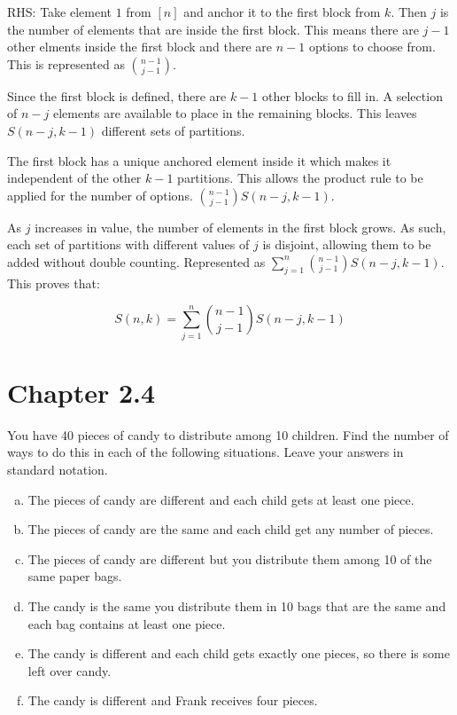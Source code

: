 \documentclass{article}
\begin{document}
\medskip
RHS: Take element $1$ from $[n]$ and anchor it to the first block from $k$. Then $j$ is the number of elements that are inside the first block. This means there are $j-1$ other elments inside the first block and there are $n-1$ options to choose from. This is represented as $\binom{n-1}{j-1}$.

\medskip
Since the first block is defined, there are $k-1$ other blocks to fill in. A selection of $n-j$ elements are available to place in the remaining blocks. This leaves $S(n-j, k-1)$ different sets of partitions.

\medskip
The first block has a unique anchored element inside it which makes it independent of the other $k-1$ partitions. This allows the product rule to be applied for the number of options. $\binom{n-1}{j-1}S(n-j, k-1)$.

\medskip
As $j$ increases in value, the number of elements in the first block grows. As such, each set of partitions with different values of $j$ is disjoint, allowing them to be added without double counting. Represented as $\sum_{j=1}^{n} \binom{n-1}{j-1}S(n-j, k-1)$. This proves that:

\begin{equation*}
    S(n,k) = \sum_{j=1}^{n} \binom{n-1}{j-1} S(n-j, k-1)
\end{equation*}

\section{Chapter 2.4}
\setcounter{problem}{0}
\begin{problem} %
You have 40 pieces of candy to distribute among 10 children. Find the number of ways to do this in each of the following situations. Leave your answers in standard notation.
\begin{enumerate}[(a)]
    \item The pieces of candy are different and each child gets at least one piece.
    \item The pieces of candy are the same and each child get any number of pieces.
    \item The pieces of candy are different but you distribute them among 10 of the same paper bags.
    \item The candy is the same you distribute them in 10 bags that are the same and each bag contains at least one piece.
    \item The candy is different and each child gets exactly one pieces, so there is some left over candy.
    \item The candy is different and Frank receives four pieces.
\end{enumerate}
\end{problem}
\end{document}

